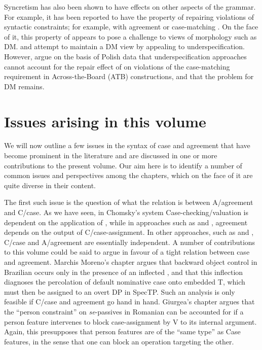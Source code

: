 \documentclass[output=paper]{langsci/langscibook}
\begin{document}
Syncretism has also been shown to have effects on other aspects of the grammar. For example, it has been reported to have the property of repairing violations of syntactic constraints; for example, with agreement \citep{Schütze2003,Bhatt2013} or case-matching \citep{Citko2005,Craenenbroeck2012,Hein2016}. On the face of it, this property of  appears to pose a challenge to  views of morphology such as DM. \citet{Citko2005} and \citet{Asarina2011} attempt to maintain a DM view by appealing to underspecification. However, \citet{Hein2016} argue on the basis of Polish data that underspecification approaches cannot account for the repair effect of  on violations of the case-matching requirement in Across-the-Board (ATB) constructions, and that the problem for DM remains.

\section{Issues arising in this volume}

We will now outline a few issues in the syntax of case and agreement that have become prominent in the literature and are discussed in one or more contributions to the present volume. Our aim here is to identify a number of common issues and perspectives among the chapters, which on the face of it are quite diverse in their content.

The first such issue is the question of what the relation is between A\slash agreement and C\slash case. As we have seen, in Chomsky’s  system Case-checking\slash valuation is dependent on the application of , while in approaches such as \citet{Bobaljik2008Phi} and \citet{Preminger2014}, agreement depends on the output of C\slash case-assignment. In other approaches, such as \citet{Baker2015} and \citet{Manzini2016}, C\slash case and A\slash agreement are essentially independent. A number of contributions to this volume could be said to argue in favour of a tight relation between case and agreement. Marchis Moreno’s chapter argues that backward object control in Brazilian  occurs only in the presence of an inflected , and that this inflection diagnoses the percolation of default nominative case onto embedded T, which must then be assigned to an overt DP in SpecTP. Such an analysis is only feasible if C\slash case and agreement go hand in hand. Giurgea’s chapter argues that the ``person constraint'' on \textit{se}{}-passives in Romanian can be accounted for if a person feature intervenes to block case-assignment by V to its internal argument. Again, this presupposes that person features are of the ``same type'' as Case features, in the sense that one can block an operation targeting the other.
\end{document}
